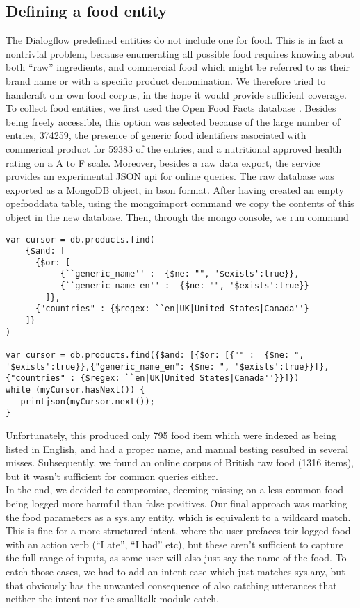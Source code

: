 \subsection{Defining a food entity}
The Dialogflow predefined entities do not include one for food. This is in fact a nontrivial problem, because enumerating all possible food requires knowing about both ``raw'' ingredients, and commercial food which might be referred to as their brand name or with a specific product denomination. We therefore tried to handcraft our own food corpus, in the hope it would provide sufficient coverage.
To collect food entities, we first used the Open Food Facts database \cite{openfoodfacts}. Besides being freely accessible, this option was selected because of the large number of entries, 374259, the presence of generic food identifiers associated with commerical product for 59383 of the entries, and a nutritional approved health rating on a A to F scale. Moreover, besides a raw data export, the service provides an experimental JSON api for online queries. 
The raw database was exported as a MongoDB \cite{mongo} object, in bson format. After having created an empty opefooddata table, using the mongoimport command we copy the contents of this object in the new database. Then, through the mongo console, we run command
\begin{lstlisting}
var cursor = db.products.find( 
    {$and: [
      {$or: [
           {``generic_name'' :  {$ne: "", '$exists':true}},
           {``generic_name_en'' :  {$ne: "", '$exists':true}}
        ]},
      {"countries" : {$regex: ``en|UK|United States|Canada''}
    ]}
)

var cursor = db.products.find({$and: [{$or: [{"" :  {$ne: ", '$exists':true}},{"generic_name_en": {$ne: ", '$exists':true}}]}, {"countries" : {$regex: ``en|UK|United States|Canada''}}]})
while (myCursor.hasNext()) {
   printjson(myCursor.next());
}
\end{lstlisting}
Unfortunately, this produced only 795 food item which were indexed as being listed in English, and had a proper name, and manual testing resulted in several misses. Subsequently, we found an online corpus of British raw food \cite{}(1316 items), but it wasn't sufficient for common queries either. \\
In the end, we decided to compromise, deeming missing on a less common food being logged more harmful than false positives. Our final approach was marking the food parameters as a sys.any entity, which is equivalent to a wildcard match. This is fine for a more structured intent, where the user prefaces teir logged food with an action verb (``I ate'', ``I had'' etc), but these aren't sufficient to capture the full range of inputs, as some user will also just say the name of the food. To catch those cases, we had to add an intent case which just matches sys.any, but that obviously has the unwanted consequence of also catching utterances that neither the intent nor the smalltalk module catch.
